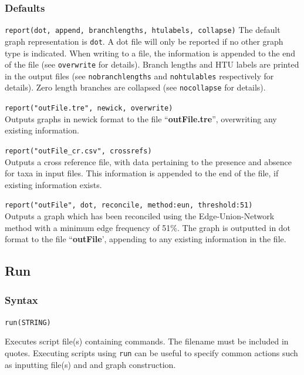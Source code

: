 	\subsubsection{Defaults}
		\texttt{report(dot, append, branchlengths, htulabels, collapse)}
		The default graph representation is \texttt{dot}. A dot file will only be 
		reported if no other graph type is indicated. When writing to a file, the 
		information is appended to the end of the file (see \texttt{overwrite} for 
		details). Branch lengths and HTU labels are printed in the output files 
		(see \texttt{nobranchlengths} and \texttt{nohtulables} respectively
		for details). Zero length branches are collapsed (see \texttt{nocollapse}
		for details). 
		
		
	\begin{example}
		\item{\texttt{report("outFile.tre", newick, overwrite)}\\ Outputs graphs in newick format to 
		the file ``\textbf{outFile.tre}'', overwriting any existing information.}
		
		\item{\texttt{report("outFile\_cr.csv", crossrefs)}\\ Outputs a cross reference file, with
		data pertaining to the presence and absence for taxa in input files. This information
		is appended to the end of the file, if existing information exists.}
		
		\item{\texttt{report("outFile", dot, reconcile, method:eun, threshold:51)}\\ Outputs a
		graph which has been reconciled using the Edge-Union-Network method with a 
		minimum edge frequency of 51\%. The graph is outputted in dot format to the 
		file ``\textbf{outFile}', appending to any existing information in the file.}
	\end{example}

\subsection{Run}
	\subsubsection{Syntax}
		\texttt{run(STRING)}
		
	\begin{phygdescription}
		{Executes \phyg script file(s) containing commands. The filename must be 
		included in quotes. Executing scripts using \texttt{run} can be useful to specify 
		common actions such as inputting file(s) and and graph construction.}
	\end{phygdescription}
	
